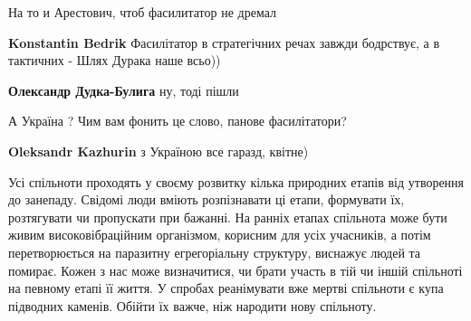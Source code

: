 \begin{itemize}
 
На то и Арестович, чтоб фасилитатор не дремал

\begin{itemize}
 
\textbf{Konstantin Bedrik} Фасилітатор в стратегічних речах завжди бодрствує, а в тактичних - Шлях Дурака наше всьо))

 
\textbf{Олександр Дудка-Булига} ну, тоді пішли
\end{itemize}

 
А Україна ? Чим вам фонить це слово, панове фасилітатори?

\begin{itemize}
 
\textbf{Oleksandr Kazhurin} з Україною все гаразд, квітне)
\end{itemize}

 

Усі спільноти проходять у своєму розвитку кілька природних етапів від утворення
до занепаду. Свідомі люди вміють розпізнавати ці етапи, формувати їх,
розтягувати чи пропускати при бажанні. На ранніх етапах спільнота може бути
живим високовібраційним організмом, корисним для усіх учасників, а потім
перетворюється на паразитну егрегоріальну структуру, виснажує людей та помирає.
Кожен з нас може визначитися, чи брати участь в тій чи іншій спільноті на
певному етапі її життя. У спробах реанімувати вже мертві спільноти є купа
підводних каменів. Обійти їх важче, ніж народити нову спільноту.



\end{itemize}
